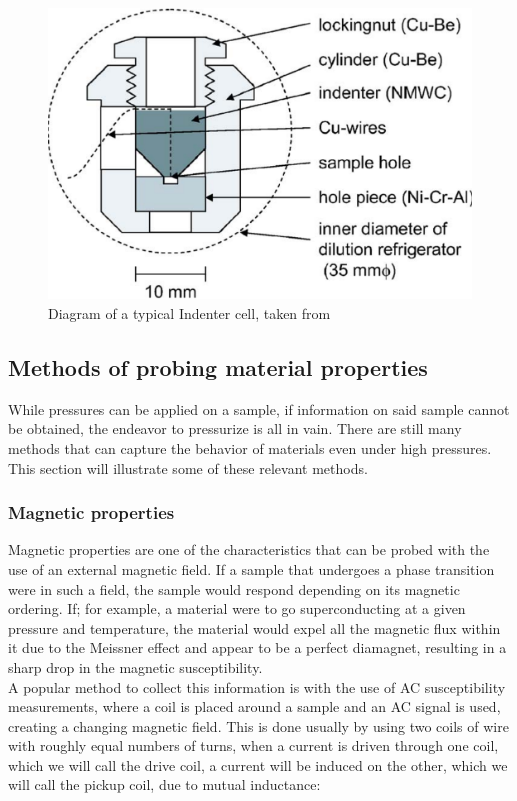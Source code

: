 \documentclass[11pt,onecolumn]{article}
\begin{document}
\begin{figure}[ht]
	\centering
	\includegraphics[width=.5\columnwidth]{figures/Indenter_cell.png}
	\caption{Diagram of a typical Indenter cell, taken from \cite{IndenterCell}}
	\label{fig:3}
\end{figure}

\subsection{Methods of probing material properties}

While pressures can be applied on a sample, if information on said sample cannot be obtained, the endeavor to pressurize is all in vain. There are still many methods that can capture the behavior of materials even under high pressures. This section will illustrate some of these relevant methods.

\subsubsection{Magnetic properties}

Magnetic properties are one of the characteristics that can be probed with the use of an external magnetic field. If a sample that undergoes a phase transition were in such a field, the sample would respond depending on its magnetic ordering. If; for example, a material were to go superconducting at a given pressure and temperature, the material would expel all the magnetic flux within it due to the Meissner effect and appear to be a perfect diamagnet, resulting in a sharp drop in the magnetic susceptibility.\cite{diamagnetism}\\

A popular method to collect this information is with the use of AC susceptibility measurements, where a coil is placed around a sample and an AC signal is used, creating a changing magnetic field.\cite{ACsusceptibility} This is done usually by using two coils of wire with roughly equal numbers of turns, when a current is driven through one coil, which we will call the drive coil, a current will be induced on the other, which we will call the pickup coil, due to mutual inductance:
\end{document}
